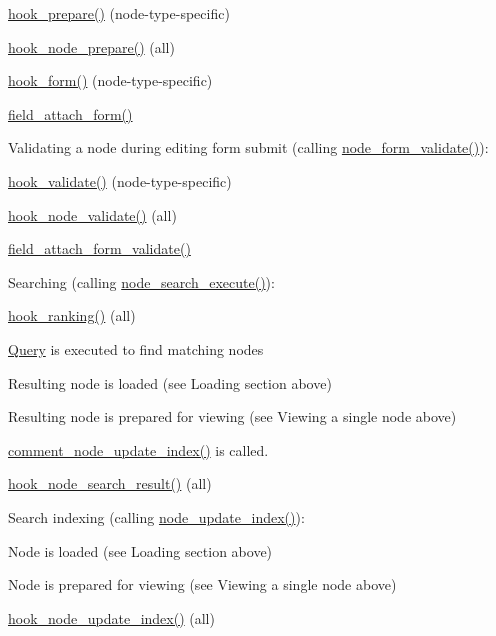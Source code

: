 \begin{DoxyItemize}
\begin{DoxyItemize}
\item \hyperlink{group__node__api__hooks_ga2dff6dd92802df6b776a4eeb0b1a737c}{hook\_\-prepare()} (node-\/type-\/specific)
\item \hyperlink{group__node__api__hooks_ga4bbe7320bd52fc6183920c8be2d9d4f6}{hook\_\-node\_\-prepare()} (all)
\item \hyperlink{group__node__api__hooks_ga52618ef4643a60878dd5a76ff9bbff30}{hook\_\-form()} (node-\/type-\/specific)
\item \hyperlink{group__field__attach_gac5bd0213dae78f7c1b3235f3acdde2c6}{field\_\-attach\_\-form()}
\end{DoxyItemize}
\item Validating a node during editing form submit (calling \hyperlink{node_8pages_8inc_aedf9f810594bc4c402a92cb197930bd9}{node\_\-form\_\-validate()}):
\begin{DoxyItemize}
\item \hyperlink{group__node__api__hooks_gacaf7cff104c642c28f76ce7ec5f33f40}{hook\_\-validate()} (node-\/type-\/specific)
\item \hyperlink{group__node__api__hooks_gad26227eaf0dd513134767a11be40ab1d}{hook\_\-node\_\-validate()} (all)
\item \hyperlink{group__field__attach_ga8c9a9775772774cefae4f6b9959d477e}{field\_\-attach\_\-form\_\-validate()}
\end{DoxyItemize}
\item Searching (calling \hyperlink{node_8module_ad7047dcdd1c1934351adb73de080c640}{node\_\-search\_\-execute()}):
\begin{DoxyItemize}
\item \hyperlink{group__node__api__hooks_gaf7a28ce3230dc96833ea5338fd26f43c}{hook\_\-ranking()} (all)
\item \hyperlink{classQuery}{Query} is executed to find matching nodes
\item Resulting node is loaded (see Loading section above)
\item Resulting node is prepared for viewing (see Viewing a single node above)
\item \hyperlink{comment_8module_a8810ffc5ce0ed7c78b997fe4e712913d}{comment\_\-node\_\-update\_\-index()} is called.
\item \hyperlink{group__node__api__hooks_ga8644320a0e04e3a503c99626d4223725}{hook\_\-node\_\-search\_\-result()} (all)
\end{DoxyItemize}
\item Search indexing (calling \hyperlink{node_8module_a4310054ba3c28aad3c32f497898fb744}{node\_\-update\_\-index()}):
\begin{DoxyItemize}
\item Node is loaded (see Loading section above)
\item Node is prepared for viewing (see Viewing a single node above)
\item \hyperlink{group__node__api__hooks_gac8420f204c69a4dc641f4d809a870b05}{hook\_\-node\_\-update\_\-index()} (all) 
\end{DoxyItemize}
\end{DoxyItemize}

